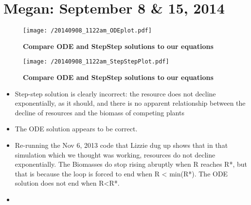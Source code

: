 \documentclass[11pt,a4paper,oneside]{article}
\begin{document}
\section{Megan: September 8 & 15, 2014}
\begin{figure}[h!]
\centering
\noindent \texttt{[image: /20140908\_1122am\_ODEplot.pdf]}
\caption{{\bf Compare ODE and StepStep solutions to our equations}}
\end{figure}

\begin{figure}[h!]
\centering
\noindent \texttt{[image: /20140908\_1122am\_StepStepPlot.pdf]}
\caption{{\bf Compare ODE and StepStep solutions to our equations}}
\end{figure}

\begin{itemize}
\item Step-step solution is clearly incorrect: the resource does not decline exponentially, as it should, and there is no apparent relationship between the decline of resources and the biomass of competing plants
\item The ODE solution appears to be correct.
\item Re-running the Nov 6, 2013 code that Lizzie dug up shows that in that simulation which we thought was working, resources do not decline exponentially.  The Biomasses do stop rising abruptly when R reaches R*, but that is because the loop is forced to end when R < min(R*).  The ODE solution does not end when R<R*.
\item 
\end{itemize}
\end{document}
